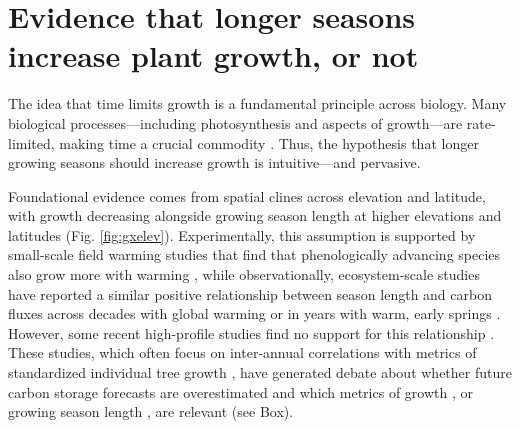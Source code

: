 \documentclass[11pt]{article}
\newcommand{\R}[1]{\label{#1}\linelabel{#1}}
\providecommand{\DIFdelbegin}{} %
\providecommand{\DIFdelend}{} %
\newcommand{\DIFscaledelfig}{0.5}
\newlength{\DIFdelgraphicswidth} %
\newlength{\DIFdelgraphicsheight} %
\newcommand{\DIFdelincludegraphics}[2][]{%
\sbox{\DIFdelgraphicsbox}{\DIFOincludegraphics[#1]{#2}}%
\settoboxwidth{\DIFdelgraphicswidth}{\DIFdelgraphicsbox} %
\settoboxtotalheight{\DIFdelgraphicsheight}{\DIFdelgraphicsbox} %
\scalebox{\DIFscaledelfig}{%
\parbox[b]{\DIFdelgraphicswidth}{\usebox{\DIFdelgraphicsbox}\\[-\baselineskip] \rule{\DIFdelgraphicswidth}{0em}}\llap{\resizebox{\DIFdelgraphicswidth}{\DIFdelgraphicsheight}{%
\setlength{\unitlength}{\DIFdelgraphicswidth}%
\begin{picture}(1,1)%
\thicklines\linethickness{2pt} %
{\color[rgb]{1,0,0}\put(0,0){\framebox(1,1){}}}%
{\color[rgb]{1,0,0}\put(0,0){\line( 1,1){1}}}%
{\color[rgb]{1,0,0}\put(0,1){\line(1,-1){1}}}%
\end{picture}%
}\hspace*{3pt}}} %
} %
\DeclareRobustCommand{\DIFdelbegin}{\DIFOdelbegin \let\includegraphics\DIFdelincludegraphics} %
\DeclareRobustCommand{\DIFdelend}{\DIFOaddend \let\includegraphics\DIFOincludegraphics} %
\begin{document}
\section*{Evidence that longer seasons increase plant growth, or not} %
The idea that time limits growth is a fundamental principle across biology. Many biological processes---including photosynthesis and aspects of growth---are rate-limited, making time a crucial commodity \citep{nobel1983biophysical,cosgrove2005growth,hilty2021plant}. Thus, the hypothesis that longer growing seasons should increase growth is intuitive---and pervasive. 

Foundational evidence comes from spatial clines across elevation and latitude, with growth decreasing alongside growing season length at higher elevations and latitudes (Fig. \ref{fig:gxelev}). Experimentally, this assumption is supported by small-scale field warming studies that find that phenologically advancing species also grow more with warming \citep[][]{Cleland:2012}, while observationally, ecosystem-scale studies have reported a similar positive relationship between season length and carbon fluxes across decades with global warming \citep{keenan2014net} or in years with warm, early springs \citep{chen1999effects}. However, some recent high-profile studies find no support for this relationship \citep{dow2022warm}. These studies, which often focus on inter-annual correlations with metrics of standardized individual tree growth \citep{dow2022warm,silvestro2023longer}, have generated debate about whether future carbon storage forecasts are overestimated and which metrics of growth \citep{green2022limits}, or growing season length \citep{korner2023four}, are relevant (see Box).
\DIFdelbegin %
\DIFdelend 
\end{document}
